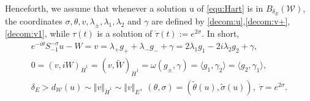 \documentclass[reqno, 11pt]{amsart}
\numberwithin{equation}{section}
\theoremstyle{plain}
\theoremstyle{definition}
\numberwithin{equation}{section}
\numberwithin{theorem}{section}
\numberwithin{equation}{section}
\numberwithin{equation}{section}
\numberwithin{theorem}{section}
\begin{document}
	Henceforth, we assume that whenever a solution u of \eqref{equ:Hart} is in $B_{\delta_E}(\mathcal{W})$, the coordinates $\sigma,\theta,v, \lambda_\pm,\lambda_{1},\lambda_{2}$ and $\gamma$ are defined by \eqref{decom:u},\eqref{decom:v+},\eqref{decom:v1}, while $\tau(t)$ is a solution of $\dot{\tau}(t):=e^{2\sigma}$. In short, 
	\begin{equation}\label{coor arou W}
	\begin{aligned}
	e^{-i\theta}S_{-1}^{-\sigma}u-W=v=\lambda_+g_{+} + \lambda_-g_{-}+\gamma=2\lambda_{1}g_1-2i\lambda_{2}g_2+\gamma,\\ 
	0=(v,iW)_{\dot H^1}=(v,\widetilde{W})_{\dot H^1}=\omega(g_{\pm},\gamma)=\langle g_1,\gamma_2 \rangle= \langle g_2,\gamma_1 \rangle,\\
	\delta_E>d_{\mathcal{W}}(u) \sim \Vert v \Vert_{\dot H^1} \sim \Vert v \Vert_{E},\;  (\theta,\sigma)=\left( \widetilde{\theta}(u),\widetilde{\sigma}(u) \right), \;\dot{\tau}=e^{2\sigma}.	
	\end{aligned}	
	\end{equation}
	
	
	
\end{document}
